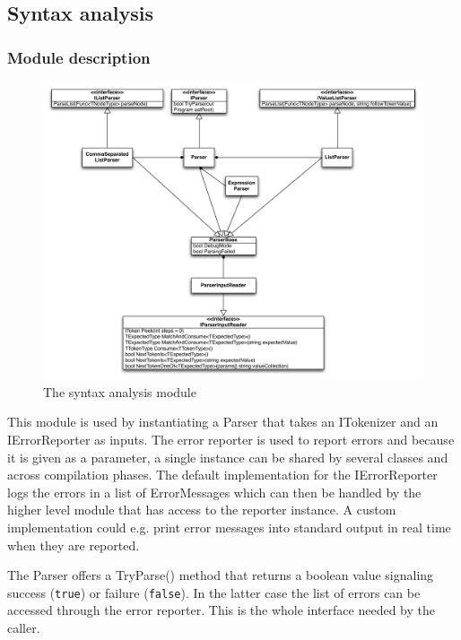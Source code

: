 \documentclass[a4paper,11pt]{article}
\begin{document}
\subsection{Syntax analysis}

\subsubsection{Module description}

\begin{figure}[h!]
\centering
\includegraphics[width=1.0\textwidth]{syntax_analysis.pdf}
\caption{The syntax analysis module}
\end{figure}

This module is used by instantiating a Parser that takes an ITokenizer and an IErrorReporter as inputs. The error reporter is used to report errors and because it is given as a parameter, a single instance can be shared by several classes and across compilation phases. The default implementation for the IErrorReporter logs the errors in a list of ErrorMessages which can then be handled by the higher level module that has access to the reporter instance. A custom implementation could e.g. print error messages into standard output in real time when they are reported.

The Parser offers a TryParse() method that returns a boolean value signaling success (\verb,true,) or failure (\verb,false,). In the latter case the list of errors can be accessed through the error reporter. This is the whole interface needed by the caller.
\end{document}
